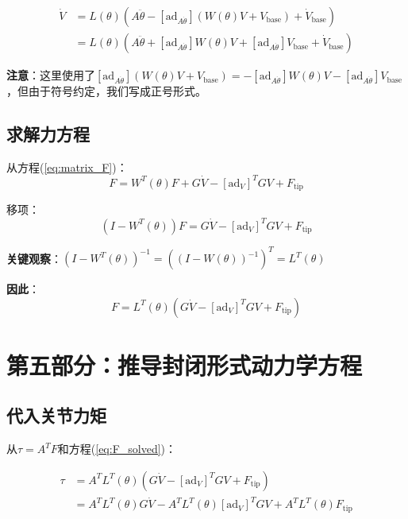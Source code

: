 \documentclass[12pt,a4paper]{article}
\begin{document}
\begin{align}
\dot{V} &= L(\theta)\left(A\ddot{\theta} - [\text{ad}_{A\dot{\theta}}](W(\theta)V + V_{\text{base}}) + \dot{V}_{\text{base}}\right) \\
&= L(\theta)\left(A\ddot{\theta} + [\text{ad}_{A\dot{\theta}}]W(\theta)V + [\text{ad}_{A\dot{\theta}}]V_{\text{base}} + \dot{V}_{\text{base}}\right)
\label{eq:V_dot_solved}
\end{align}

\textbf{注意}：这里使用了$[\text{ad}_{A\dot{\theta}}](W(\theta)V + V_{\text{base}}) = -[\text{ad}_{A\dot{\theta}}]W(\theta)V - [\text{ad}_{A\dot{\theta}}]V_{\text{base}}$，但由于符号约定，我们写成正号形式。

\subsection{求解力方程}

从方程(\ref{eq:matrix_F})：
\begin{equation}
F = W^T(\theta)F + G\dot{V} - [\text{ad}_V]^T GV + F_{\text{tip}}
\end{equation}

移项：
\begin{equation}
(I - W^T(\theta))F = G\dot{V} - [\text{ad}_V]^T GV + F_{\text{tip}}
\end{equation}

\textbf{关键观察}：$(I - W^T(\theta))^{-1} = ((I - W(\theta))^{-1})^T = L^T(\theta)$

\textbf{因此}：
\begin{equation}
F = L^T(\theta)(G\dot{V} - [\text{ad}_V]^T GV + F_{\text{tip}})
\label{eq:F_solved}
\end{equation}

\section{第五部分：推导封闭形式动力学方程}

\subsection{代入关节力矩}

从$\tau = A^T F$和方程(\ref{eq:F_solved})：

\begin{align}
\tau &= A^T L^T(\theta)(G\dot{V} - [\text{ad}_V]^T GV + F_{\text{tip}}) \\
&= A^T L^T(\theta)G\dot{V} - A^T L^T(\theta)[\text{ad}_V]^T GV + A^T L^T(\theta)F_{\text{tip}}
\label{eq:tau_intermediate}
\end{align}
\end{document}
